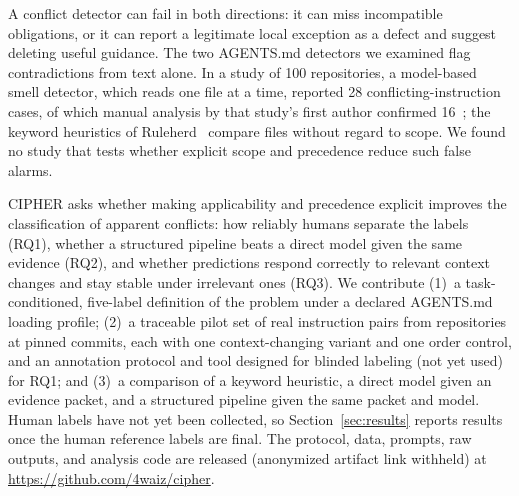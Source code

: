 A conflict detector can fail in both directions: it can miss incompatible obligations, or it can report a legitimate
local exception as a defect and suggest deleting useful guidance. The two AGENTS.md detectors we examined flag
contradictions from text alone. In a study of 100 repositories, a model-based smell detector, which reads one file at a
time, reported 28 conflicting-instruction cases, of which manual analysis by that study's first author confirmed
16~\cite{santos2026smells}; the keyword heuristics of Ruleherd~\cite{ruleherd} compare files without regard to scope. We
found no study that tests whether explicit scope and precedence reduce such false alarms.

CIPHER asks whether making applicability and precedence explicit improves the classification of apparent conflicts:
how reliably humans separate the labels (RQ1), whether a structured pipeline beats a direct model given the same
evidence (RQ2), and whether predictions respond correctly to relevant context changes and stay stable under irrelevant
ones (RQ3). We contribute (1)~a task-conditioned, five-label definition of the problem under a declared AGENTS.md
loading profile; (2)~a traceable pilot set of \NOriginals{} real instruction pairs from \NEvalReposWord{} repositories at
pinned commits, each with one context-changing variant and one order control, and an annotation protocol and tool
designed for blinded labeling (not yet used) for RQ1; and (3)~a comparison of a keyword heuristic, a direct model given
an evidence packet, and a structured pipeline given the same packet and model. Human labels have not yet been collected, so Section~\ref{sec:results} reports
\ifresults\else results once the human reference labels are final.\fi{} The protocol, data,
prompts, raw outputs, and analysis code are released\ifanon{} (anonymized artifact link withheld)\else{} at
\url{https://github.com/4waiz/cipher}\fi.


